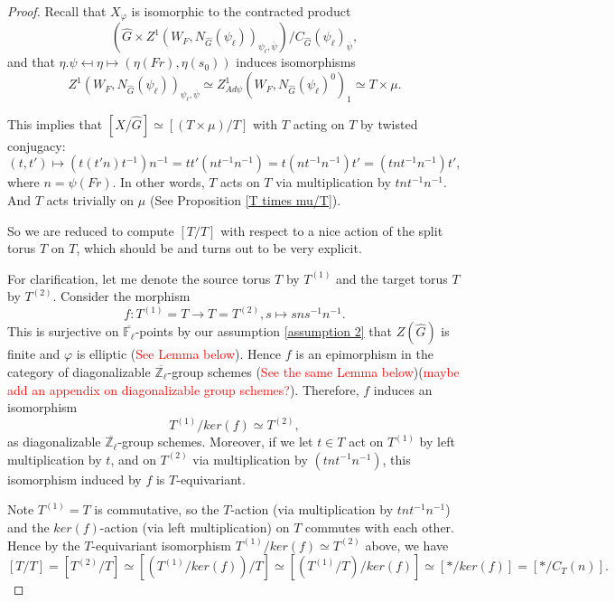 \documentclass{article}
\newcommand{\red}[1]{\textcolor{red}{#1}}
\begin{document}
\begin{proof}
	Recall that $X_{\varphi}$ is isomorphic to the contracted product 
	$$(\hat{G} \times Z^1(W_F, N_{\hat{G}}(\psi_{\ell}))_{\psi_{\ell}, \overline{\psi}})/C_{\hat{G}}(\psi_{\ell})_{\overline{\psi}},$$ 
	and that $\eta.\psi \mapsfrom \eta \mapsto (\eta(Fr), \eta(s_0))$ induces isomorphisms
	$$Z^1(W_F, N_{\hat{G}}(\psi_{\ell}))_{\psi_{\ell}, \overline{\psi}} \simeq Z^1_{Ad\psi}(W_F, N_{\hat{G}}(\psi_{\ell})^0)_1 \simeq T \times \mu.$$
	
	This implies that $[X/\hat{G}] \simeq [(T \times \mu)/T]$ with $T$ acting on $T$ by twisted conjugacy:
	$$(t, t') \mapsto \left(t(t'n)t^{-1}\right)n^{-1}=tt'(nt^{-1}n^{-1})=t(nt^{-1}n^{-1})t'=(tnt^{-1}n^{-1})t',$$
	where $n=\psi(Fr)$. In other words, $T$ acts on $T$ via multiplication by $tnt^{-1}n^{-1}$. And $T$ acts trivially on $\mu$ (See Proposition \ref{T times mu/T}).
	
	So we are reduced to compute $[T/T]$ with respect to a nice action of the split torus $T$ on $T$, which should be and turns out to be very explicit.
	
	For clarification, let me denote the source torus $T$ by $T^{(1)}$ and the target torus $T$ by $T^{(2)}$. Consider the morphism
	$$f: T^{(1)} = T \to T = T^{(2)}, s \mapsto sns^{-1}n^{-1}.$$
	This is surjective on $\overline{\mathbb{F}_{\ell}}$-points by our assumption \ref{assumption 2} that $Z(\hat{G})$ is finite and $\varphi$ is elliptic (\red{See Lemma below}). Hence $f$ is an epimorphism in the category of diagonalizable $\overline{\mathbb{Z}_{\ell}}$-group schemes (\red{See the same Lemma below})(\red{maybe add an appendix on diagonalizable group schemes?}). Therefore, $f$ induces an isomorphism 
	$$T^{(1)}/ker(f) \simeq T^{(2)},$$
	as diagonalizable $\overline{\mathbb{Z}_{\ell}}$-group schemes. Moreover, if we let $t \in T$ act on $T^{(1)}$ by left multiplication by $t$, and on $T^{(2)}$ via multiplication by $(tnt^{-1}n^{-1})$, this isomorphism induced by $f$ is $T$-equivariant.
	
	Note $T^{(1)}=T$ is commutative, so the $T$-action (via multiplication by $tnt^{-1}n^{-1}$) and the $ker(f)$-action (via left multiplication) on $T$ commutes with each other. Hence by the $T$-equivariant isomorphism $T^{(1)}/ker(f) \simeq T^{(2)}$ above, we have
	$$[T/T] = [T^{(2)}/T] \simeq \left[\left(T^{(1)}/ker(f)\right)/T\right] \simeq \left[\left(T^{(1)}/T\right)/ker(f)\right] \simeq [*/ker(f)] = [*/C_T(n)].$$ 
	
	

\end{proof}
\end{document}
